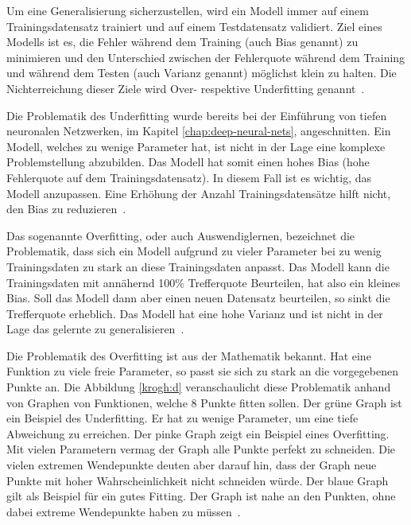 Um eine Generalisierung sicherzustellen, wird ein Modell immer auf einem Trainingsdatensatz trainiert und auf einem Testdatensatz validiert. Ziel eines Modells ist es, die Fehler während dem Training (auch Bias genannt) zu minimieren und den Unterschied zwischen der Fehlerquote während dem Training und während dem Testen (auch Varianz genannt) möglichst klein zu halten. Die Nichterreichung dieser Ziele wird Over- respektive Underfitting genannt~\autocite{Goodfellow2016}.

Die Problematik des Underfitting wurde bereits bei der Einführung von tiefen neuronalen Netzwerken, im Kapitel \ref{chap:deep-neural-nets}, angeschnitten. Ein Modell, welches zu wenige Parameter hat, ist nicht in der Lage eine komplexe Problemstellung abzubilden. Das Modell hat somit einen hohes Bias (hohe Fehlerquote auf dem Trainingsdatensatz). In diesem Fall ist es wichtig, das Modell anzupassen. Eine Erhöhung der Anzahl Trainingsdatensätze hilft nicht, den Bias zu reduzieren~\autocite{MLYearning}.

Das sogenannte Overfitting, oder auch Auswendiglernen, bezeichnet die Problematik, dass sich ein Modell aufgrund zu vieler Parameter bei zu wenig Trainingsdaten zu stark an diese Trainingsdaten anpasst. Das Modell kann die Trainingsdaten mit annähernd 100\% Trefferquote Beurteilen, hat also ein kleines Bias. Soll das Modell dann aber einen neuen Datensatz beurteilen, so sinkt die Trefferquote erheblich. Das Modell hat eine hohe Varianz und ist nicht in der Lage das gelernte zu generalisieren~\autocite{MLYearning, Krogh2008}.

Die Problematik des Overfitting ist aus der Mathematik bekannt. Hat eine Funktion zu viele freie Parameter, so passt sie sich zu stark an die vorgegebenen Punkte an. Die Abbildung \ref{krogh:d} veranschaulicht diese Problematik anhand von Graphen von Funktionen, welche 8 Punkte fitten sollen. Der grüne Graph ist ein Beispiel des Underfitting. Er hat zu wenige Parameter, um eine tiefe Abweichung zu erreichen. Der pinke Graph zeigt ein Beispiel eines Overfitting. Mit vielen Parametern vermag der Graph alle Punkte perfekt zu schneiden. Die vielen extremen Wendepunkte deuten aber darauf hin, dass der Graph neue Punkte mit hoher Wahrscheinlichkeit nicht schneiden würde. Der blaue Graph gilt als Beispiel für ein gutes Fitting. Der Graph ist nahe an den Punkten, ohne dabei extreme Wendepunkte haben zu müssen~\autocite{Krogh2008}.

